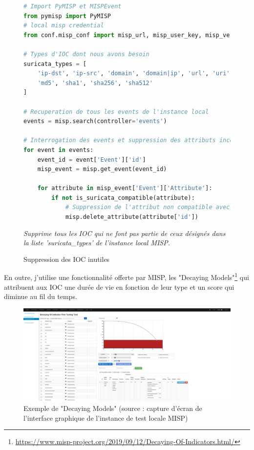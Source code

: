 \begin{figure}[h]%
    \center%
\begin{lstlisting}[language=Python]
# Import PyMISP et MISPEvent
from pymisp import PyMISP
# local misp credential
from conf.misp_conf import misp_url, misp_user_key, misp_verifycert

# Types d'IOC dont nous avons besoin
suricata_types = [
    'ip-dst', 'ip-src', 'domain', 'domain|ip', 'url', 'uri', 'hostname',
    'md5', 'sha1', 'sha256', 'sha512'
]

# Recuperation de tous les events de l'instance local
events = misp.search(controller='events')

# Interrogation des events et suppression des attributs incompatibles avec les donnees de Suricata
for event in events:
    event_id = event['Event']['id']
    misp_event = misp.get_event(event_id)
    
    for attribute in misp_event['Event']['Attribute']:
        if not is_suricata_compatible(attribute):
            # Suppression de l'attribut non compatible avec Suricata
            misp.delete_attribute(attribute['id'])
\end{lstlisting}
{\small
    \textit{Supprime tous les IOC qui ne font pas partie de ceux désignés dans la liste 'suricata\_types' de l'instance local MISP.}
    }
    \caption[Suppression des IOC inutiles]{Suppression des IOC inutiles}\label{fig:RemoveIOC}
\end{figure}

\vspace{1em}

En outre, j'utilise une fonctionnalité offerte par MISP, les "Decaying Models"\footnote{\url{https://www.misp-project.org/2019/09/12/Decaying-Of-Indicators.html/}} qui attribuent aux IOC une durée de vie en fonction de leur type et un score qui diminue au fil du temps.\\

\newpage

\begin{figure}[h]%
    \center%
    \includegraphics[width=1\textwidth]{assets/CaptureDecayingModel.png}
    \caption[Exemple de "Decaying Model" (source : capture d'écran de l'interface graphique de l'instance de test locale MISP)]{Exemple de "Decaying Models" (source : capture d'écran de l'interface graphique de l'instance de test locale MISP)}\label{fig:CaptureDecayingModel}
\end{figure}

